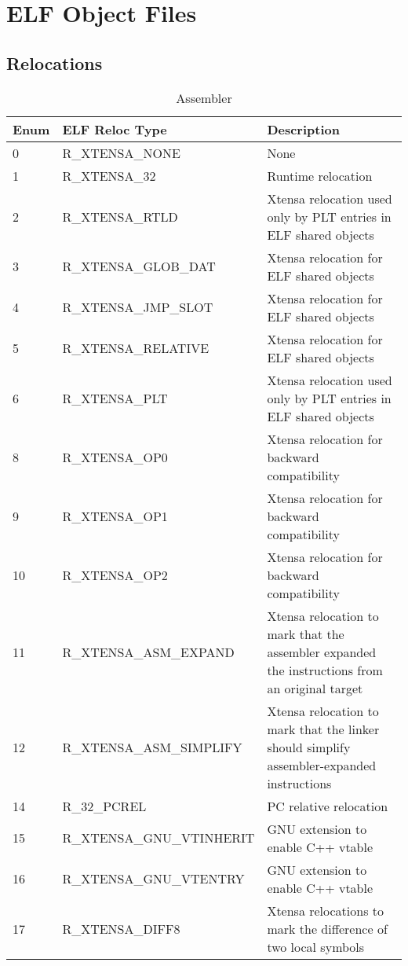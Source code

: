 \chapter{ELF Object Files}
\section{Relocations}
\begin{smalltables}
\begin{longtable}{|p{1cm}|p{6cm}|p{10cm}|}
	\caption{Assembler\label{long}}\\
	\hline
	Enum & ELF Reloc Type & Description \\
	\hline
	\endhead
	0 & R\_XTENSA\_NONE & None \\ \hline
	1 & R\_XTENSA\_32 & Runtime relocation \\ \hline
	2 & R\_XTENSA\_RTLD & Xtensa relocation used only by PLT entries in ELF shared objects \\ \hline
	3 & R\_XTENSA\_GLOB\_DAT & Xtensa relocation for ELF shared objects \\ \hline
	4 & R\_XTENSA\_JMP\_SLOT & Xtensa relocation for ELF shared objects \\ \hline
	5 & R\_XTENSA\_RELATIVE & Xtensa relocation for ELF shared objects \\ \hline
	6 & R\_XTENSA\_PLT & Xtensa relocation used only by PLT entries in ELF shared objects \\ \hline
	8 & R\_XTENSA\_OP0 & Xtensa relocation for backward compatibility \\ \hline
	9 & R\_XTENSA\_OP1 & Xtensa relocation for backward compatibility \\ \hline
	10 & R\_XTENSA\_OP2 & Xtensa relocation for backward compatibility \\ \hline
	11 & R\_XTENSA\_ASM\_EXPAND & Xtensa relocation to mark that the assembler expanded the instructions from an original target \\ \hline
	12 & R\_XTENSA\_ASM\_SIMPLIFY & Xtensa relocation to mark that the linker should simplify assembler-expanded instructions \\ \hline
	14 & R\_32\_PCREL & PC relative relocation \\ \hline
	15 & R\_XTENSA\_GNU\_VTINHERIT & GNU extension to enable C++ vtable\\ \hline
	16 & R\_XTENSA\_GNU\_VTENTRY & GNU extension to enable C++ vtable\\ \hline
	17 & R\_XTENSA\_DIFF8 & Xtensa relocations to mark the difference of two local symbols \\ \hline

\end{longtable}
\end{smalltables}

